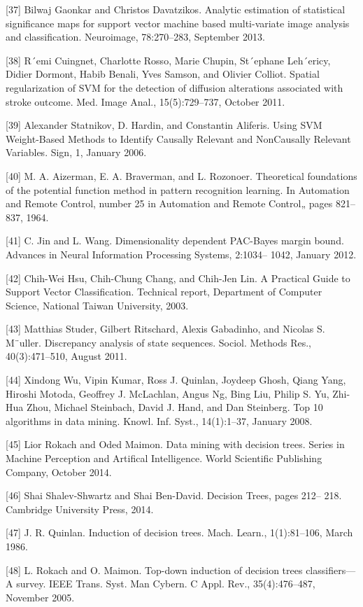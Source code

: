 \documentclass[preprint,12pt]{elsarticle}
\begin{document}
[37] Bilwaj Gaonkar and Christos Davatzikos. Analytic estimation of statistical significance maps for support vector machine based multi-variate image analysis and classification. Neuroimage, 78:270–283, September 2013. 

[38] R´emi Cuingnet, Charlotte Rosso, Marie Chupin, St´ephane Leh´ericy, Didier Dormont, Habib Benali, Yves Samson, and Olivier Colliot. Spatial regularization of SVM for the detection of diffusion alterations associated with stroke outcome. Med. Image Anal., 15(5):729–737, October 2011. 

[39] Alexander Statnikov, D. Hardin, and Constantin Aliferis. Using SVM Weight-Based Methods to Identify Causally Relevant and NonCausally Relevant Variables. Sign, 1, January 2006. 

[40] M. A. Aizerman, E. A. Braverman, and L. Rozonoer. Theoretical foundations of the potential function method in pattern recognition learning. In Automation and Remote Control, number 25 in Automation and Remote Control„ pages 821–837, 1964. 

[41] C. Jin and L. Wang. Dimensionality dependent PAC-Bayes margin bound. Advances in Neural Information Processing Systems, 2:1034– 1042, January 2012. 

[42] Chih-Wei Hsu, Chih-Chung Chang, and Chih-Jen Lin. A Practical Guide to Support Vector Classification. Technical report, Department of Computer Science, National Taiwan University, 2003. 

[43] Matthias Studer, Gilbert Ritschard, Alexis Gabadinho, and Nicolas S. M¨uller. Discrepancy analysis of state sequences. Sociol. Methods Res., 40(3):471–510, August 2011. 

[44] Xindong Wu, Vipin Kumar, Ross J. Quinlan, Joydeep Ghosh, Qiang Yang, Hiroshi Motoda, Geoffrey J. McLachlan, Angus Ng, Bing Liu, Philip S. Yu, Zhi-Hua Zhou, Michael Steinbach, David J. Hand, and Dan Steinberg. Top 10 algorithms in data mining. Knowl. Inf. Syst., 14(1):1–37, January 2008. 

[45] Lior Rokach and Oded Maimon. Data mining with decision trees. Series in Machine Perception and Artifical Intelligence. World Scientific Publishing Company, October 2014. 

[46] Shai Shalev-Shwartz and Shai Ben-David. Decision Trees, pages 212– 218. Cambridge University Press, 2014. 

[47] J. R. Quinlan. Induction of decision trees. Mach. Learn., 1(1):81–106, March 1986. 

[48] L. Rokach and O. Maimon. Top-down induction of decision trees classifiers—A survey. IEEE Trans. Syst. Man Cybern. C Appl. Rev., 35(4):476–487, November 2005. 
\end{document}
